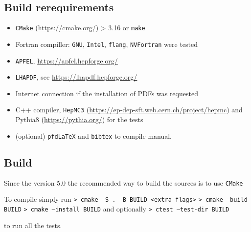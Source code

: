 \documentclass[12pt]{article}
\begin{document}
\subsection{Build rerequirements}

\begin{itemize}
 \item \texttt{CMake} (\url{https://cmake.org/}) > 3.16 or \texttt{make}
 \item Fortran compiller: \texttt{GNU}, \texttt{Intel}, \texttt{flang}, \texttt{NVFortran} were tested
 \item \texttt{APFEL}, \url{https://apfel.hepforge.org/}
 \item \texttt{LHAPDF}, see \url{https://lhapdf.hepforge.org/}
 \item Internet connection if the installation of PDFs was requested
 \item C++ compiler, \texttt{HepMC3} (\url{https://ep-dep-sft.web.cern.ch/project/hepmc}) and Pythia8 (\url{https://pythia.org/}) for the tests
 \item (optional) \texttt{pfdLaTeX} and \texttt{bibtex}  to compile manual.
\end{itemize}

\subsection{Build}

Since the version 5.0 the recommended way to build the sources is to use \texttt{CMake}

To compile simply run
\newline
\newline
\texttt{> cmake -S . -B BUILD <extra flags>}
\newline
\texttt{> cmake --build BUILD}
\newline
\texttt{> cmake --install BUILD}
\newline
\newline
and optionally
\newline
\texttt{> ctest --test-dir BUILD}
\newline

to run all the tests.
\end{document}
